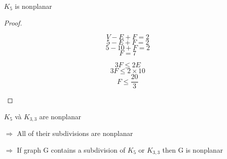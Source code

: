 \begin{lemma}
    $K_5$ is nonplanar
\end{lemma}
\begin{proof}
    \begin{figure}[H]
        \begin{minipage}{0.3\textwidth}
            $$V-E+F=2$$
            $$5-E+F=2$$
            $$5-10+F=2$$
            $$F=7$$
        \end{minipage}
        \hfill
        \begin{minipage}{0.35\textwidth}
            \centering
        \end{minipage}
        \hfill
        \begin{minipage}{0.3\textwidth}
            \centering
            $$3F \leq 2E$$
            $$3F \leq 2 \times 10$$
            $$F \leq \frac{20}{3}$$
        \end{minipage}
    \end{figure}
\end{proof}
\begin{recap}
    $K_5$ và $K_{3,3}$ are nonplanar

    $\Rightarrow$ All of their subdivisions are nonplanar

    $\Rightarrow$ If graph G contains a subdivision of $K_5$ or $K_{3,3}$ then G is nonplanar
\end{recap}

